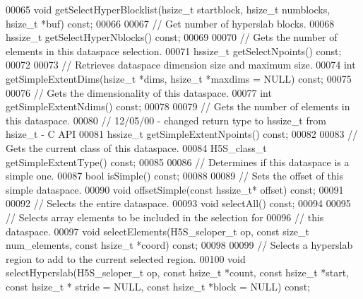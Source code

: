 \begin{DoxyCode}
00065         \textcolor{keywordtype}{void} getSelectHyperBlocklist(hsize\_t startblock, hsize\_t numblocks, hsize\_t *buf) \textcolor{keyword}{const};
00066 
00067         \textcolor{comment}{// Get number of hyperslab blocks.}
00068         hssize\_t getSelectHyperNblocks() \textcolor{keyword}{const};
00069 
00070         \textcolor{comment}{// Gets the number of elements in this dataspace selection.}
00071         hssize\_t getSelectNpoints() \textcolor{keyword}{const};
00072 
00073         \textcolor{comment}{// Retrieves dataspace dimension size and maximum size.}
00074         \textcolor{keywordtype}{int} getSimpleExtentDims(hsize\_t *dims, hsize\_t *maxdims = NULL) \textcolor{keyword}{const};
00075 
00076         \textcolor{comment}{// Gets the dimensionality of this dataspace.}
00077         \textcolor{keywordtype}{int} getSimpleExtentNdims() \textcolor{keyword}{const};
00078 
00079         \textcolor{comment}{// Gets the number of elements in this dataspace.}
00080         \textcolor{comment}{// 12/05/00 - changed return type to hssize\_t from hsize\_t - C API}
00081         hssize\_t getSimpleExtentNpoints() \textcolor{keyword}{const};
00082 
00083         \textcolor{comment}{// Gets the current class of this dataspace.}
00084         H5S\_class\_t getSimpleExtentType() \textcolor{keyword}{const};
00085 
00086         \textcolor{comment}{// Determines if this dataspace is a simple one.}
00087         \textcolor{keywordtype}{bool} isSimple() \textcolor{keyword}{const};
00088 
00089         \textcolor{comment}{// Sets the offset of this simple dataspace.}
00090         \textcolor{keywordtype}{void} offsetSimple(\textcolor{keyword}{const} hssize\_t* offset) \textcolor{keyword}{const};
00091 
00092         \textcolor{comment}{// Selects the entire dataspace.}
00093         \textcolor{keywordtype}{void} selectAll() \textcolor{keyword}{const};
00094 
00095         \textcolor{comment}{// Selects array elements to be included in the selection for}
00096         \textcolor{comment}{// this dataspace.}
00097         \textcolor{keywordtype}{void} selectElements(H5S\_seloper\_t op, \textcolor{keyword}{const} \textcolor{keywordtype}{size\_t} num\_elements, \textcolor{keyword}{const} hsize\_t *coord) \textcolor{keyword}{const};
00098 
00099         \textcolor{comment}{// Selects a hyperslab region to add to the current selected region.}
00100         \textcolor{keywordtype}{void} selectHyperslab(H5S\_seloper\_t op, \textcolor{keyword}{const} hsize\_t *count, \textcolor{keyword}{const} hsize\_t *start, \textcolor{keyword}{const} hsize\_t *
      stride = NULL, \textcolor{keyword}{const} hsize\_t *block = NULL) \textcolor{keyword}{const};

\end{DoxyCode}
